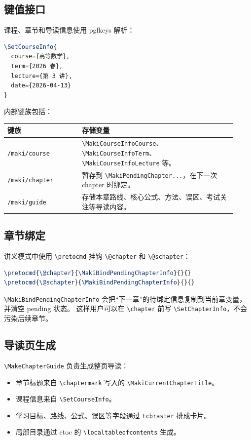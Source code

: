 \documentclass[a4paper,11pt]{ltxdoc}
\newcommand{\mpkg}[1]{\textsf{#1}}
\newcommand{\menv}[1]{\texttt{#1}}
\newcommand{\mcmd}[1]{\texttt{\textbackslash#1}}
\newcommand{\mkey}[1]{\texttt{#1}}
\begin{document}
\subsection{键值接口}

课程、章节和导读信息使用 \mpkg{pgfkeys} 解析：

\begin{lstlisting}[language=TeX]
\SetCourseInfo{
  course={高等数学},
  term={2026 春},
  lecture={第 3 讲},
  date={2026-04-13}
}
\end{lstlisting}

内部键族包括：

\begin{longtable}{@{}p{0.3\linewidth}p{0.62\linewidth}@{}}
\toprule
键族 & 存储变量 \\
\midrule
\mkey{/maki/course} & \mcmd{MakiCourseInfoCourse}、\mcmd{MakiCourseInfoTerm}、\mcmd{MakiCourseInfoLecture} 等。\\
\mkey{/maki/chapter} & 暂存到 \mcmd{MakiPendingChapter...}，在下一次 chapter 时绑定。\\
\mkey{/maki/guide} & 存储本章路线、核心公式、方法、误区、考试关注等导读内容。\\
\bottomrule
\end{longtable}

\subsection{章节绑定}

讲义模式中使用 \mcmd{pretocmd} 挂钩 \mcmd{@chapter} 和 \mcmd{@schapter}：

\begin{lstlisting}[language=TeX]
\pretocmd{\@chapter}{\MakiBindPendingChapterInfo}{}{}
\pretocmd{\@schapter}{\MakiBindPendingChapterInfo}{}{}
\end{lstlisting}

\mcmd{MakiBindPendingChapterInfo} 会把“下一章”的待绑定信息复制到当前章变量，并清空 pending 状态。
这样用户可以在 \mcmd{chapter} 前写 \mcmd{SetChapterInfo}，不会污染后续章节。

\subsection{导读页生成}

\mcmd{MakeChapterGuide} 负责生成整页导读：

\begin{itemize}
\item 章节标题来自 \mcmd{chaptermark} 写入的 \mcmd{MakiCurrentChapterTitle}。
\item 课程信息来自 \mcmd{SetCourseInfo}。
\item 学习目标、路线、公式、误区等字段通过 \menv{tcbraster} 排成卡片。
\item 局部目录通过 \mpkg{etoc} 的 \mcmd{localtableofcontents} 生成。
\end{itemize}
\end{document}
